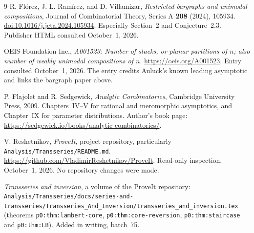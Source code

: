 \documentclass[11pt,a4paper]{article}
\numberwithin{equation}{section}
\theoremstyle{definition}\newtheorem{definition}[theorem]{Definition}
\theoremstyle{remark}\newtheorem{remark}[theorem]{Remark}
\begin{document}
\begingroup
\raggedright
\begin{thebibliography}{9}
R. Fl\'orez, J. L. Ram\'irez, and D. Villamizar,
\emph{Restricted bargraphs and unimodal compositions},
Journal of Combinatorial Theory, Series A \textbf{208} (2024), 105934.
\href{https://doi.org/10.1016/j.jcta.2024.105934}{doi:10.1016/j.jcta.2024.105934}.
Especially Section~2 and Conjecture~2.3. Publisher HTML consulted
October~1, 2026.

OEIS Foundation Inc., \emph{A001523: Number of stacks, or planar
partitions of \(n\); also number of weakly unimodal compositions of
\(n\)}. \url{https://oeis.org/A001523}.
Entry consulted October~1, 2026. The entry credits Auluck's known leading
asymptotic and links the bargraph paper above.

P. Flajolet and R. Sedgewick, \emph{Analytic Combinatorics},
Cambridge University Press, 2009. Chapters~IV--V for rational and
meromorphic asymptotics, and Chapter~IX for parameter distributions.
Author's book page: \url{https://sedgewick.io/books/analytic-combinatorics/}.

V. Reshetnikov, \emph{ProveIt}, project repository, particularly
\texttt{Analysis/Transseries/README.md}.
\url{https://github.com/VladimirReshetnikov/ProveIt}.
Read-only inspection, October~1, 2026. No repository changes were made.

\emph{Transseries and inversion}, a volume of the ProveIt repository:
\nolinkurl{Analysis/Transseries/docs/series-and-transseries/Transseries_And_Inversion/transseries_and_inversion.tex}
(theorems \texttt{p0:thm:lambert-core}, \texttt{p0:thm:core-reversion},
\texttt{p0:thm:staircase} and \texttt{p0:thm:LB}). Added in writing,
batch~75.
\end{thebibliography}
\endgroup
\end{document}
